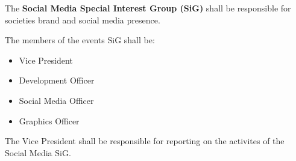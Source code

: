\begin{clause}
    The \textbf{Social Media Special Interest Group (SiG)} shall be responsible for societies brand and social media presence.
\end{clause}

\begin{subclause}
    The members of the events SiG shall be:
    \begin{itemize}
        \item Vice President
        \item Development Officer
        \item Social Media Officer
        \item Graphics Officer
    \end{itemize}
\end{subclause}

\begin{subclause}
    The Vice President shall be responsible for reporting on the activites of the Social Media SiG.
\end{subclause}
